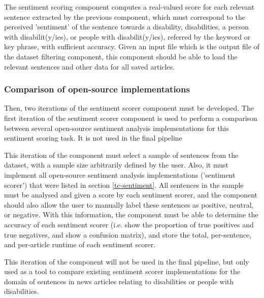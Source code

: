 \documentclass{report}
\begin{document}
The sentiment scoring component computes a real-valued score for each relevant sentence extracted by the previous component, which must correspond to the perceived 'sentiment' of the sentence towards a disability, disabilities, a person with disabilit(y/ies), or people with disabilit(y/ies), referred by the keyword or key phrase, with sufficient accuracy.
Given an input file which is the output file of the dataset filtering component, this component should be able to load the relevant sentences and other data for all saved articles.

\subsubsection{Comparison of open-source implementations} \label{req-sentiment-comparison}

Then, two iterations of the sentiment scorer component must be developed.
The first iteration of the sentiment scorer component is used to perform a comparison between several open-source sentiment analysis implementations for this sentiment scoring task.
It is not used in the final pipeline

This iteration of the component must select a sample of sentences from the dataset, with a sample size arbitrarily defined by the user.
Also, it must implement all open-source sentiment analysis implementations ('sentiment scorer') that were listed in section \ref{tc-sentiment}.
All sentences in the sample must be analysed and given a score by each sentiment scorer, and the component should also allow the user to manually label these sentences as positive, neutral, or negative.
With this information, the component must be able to determine the accuracy of each sentiment scorer (i.e. show the proportion of true positives and true negatives, and show a confusion matrix), and store the total, per-sentence, and per-article runtime of each sentiment scorer.

This iteration of the component will not be used in the final pipeline, but only used as a tool to compare existing sentiment scorer implementations for the domain of sentences in news articles relating to disabilities or people with disabilities.

\end{document}
